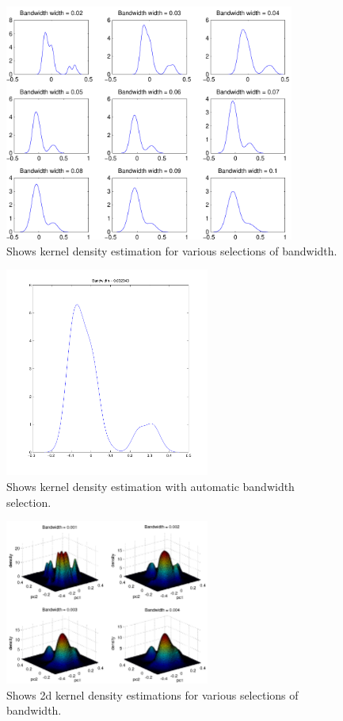 \begin{figure}[!htbp]
  \centering
  \includegraphics[width=0.85\textwidth]{./images/q37kde}
  \caption{Shows kernel density estimation for various selections of bandwidth.}
  \label{fig:q37kde}
\end{figure}

\begin{figure}[!htbp]
  \centering
  \includegraphics[width=0.6\textwidth]{./images/q37kdeauto}
  \caption{Shows kernel density estimation with automatic bandwidth selection.}
  \label{fig:q37kdeauto}
\end{figure}



\begin{figure}[!htbp]
  \centering
  \includegraphics[width=0.6\textwidth]{./images/q373dkde1}
  \caption{Shows 2d kernel density estimations for various selections of bandwidth.}
  \label{fig:q373dkde1}
\end{figure}


